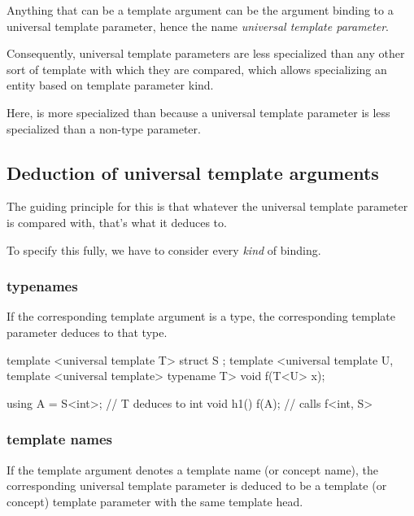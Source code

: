 \documentclass{wg21}
\begin{document}
Anything that can be a template argument can be the argument binding to a universal template parameter, hence the name \emph{universal template parameter}.

Consequently, universal template parameters are less specialized than any other sort of template with which they are compared,
which allows specializing an entity based on template parameter kind.


Here,  is more specialized than  because a universal template parameter is less specialized than a non-type parameter.

\subsection{Deduction of universal template arguments}

The guiding principle for this is that whatever the universal template parameter is compared with, that's what it deduces to.

To specify this fully, we have to consider every \emph{kind} of binding.

\subsubsection{typenames}

If the corresponding template argument is a type, the corresponding template parameter deduces to that type.

\begin{colorblock}
template <universal template T>
struct S {};
template <universal template U, template <universal template> typename T>
void f(T<U> x);

using A = S<int>; // T deduces to int
void h1() {
  f(A{}); // calls f<int, S>
}
\end{colorblock}

\subsubsection{template names}

If the template argument denotes a template name (or concept name), the corresponding universal template parameter
is deduced to be a template (or concept) template parameter with the same template head.
\end{document}
